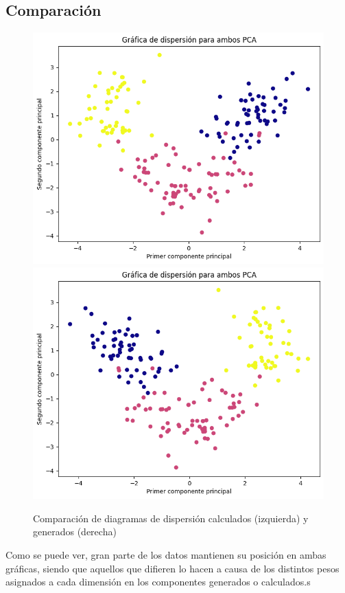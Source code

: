 \subsection[Comparación]{Comparación}
\begin{center}
    \begin{figure}[!ht]
        \centering
        \includegraphics[scale=0.32]{Auto_PCA_Scatter.png}
        \includegraphics[scale=0.32]{Manual_PCA_Scatter.png}
        \caption{Comparación de diagramas de dispersión calculados (izquierda) y generados (derecha)}
    \end{figure}
\end{center}
Como se puede ver, gran parte de los datos mantienen su posición en ambas gráficas, siendo que aquellos que difieren lo hacen a causa de los distintos pesos asignados a cada dimensión en los componentes generados o calculados.s